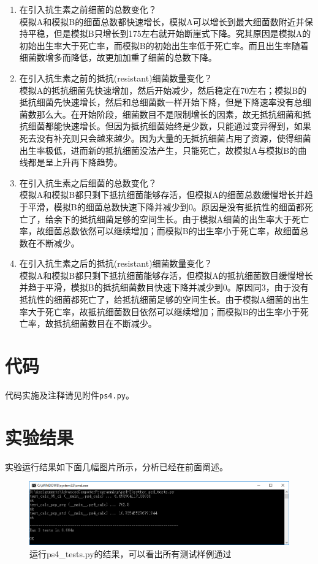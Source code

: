 \documentclass[logo,reportComp]{thesis}
\begin{document}
\begin{enumerate}
	\item 在引入抗生素之前细菌的总数变化？\\
	模拟A和模拟B的细菌总数都快速增长，模拟A可以增长到最大细菌数附近并保持平稳，但是模拟B只增长到175左右就开始断崖式下降。究其原因是模拟A的初始出生率大于死亡率，而模拟B的初始出生率低于死亡率。而且出生率随着细菌数增多而降低，故更加加重了细菌的总数下降。
	\item 在引入抗生素之前的抵抗(resistant)细菌数量变化？\\
	模拟A的抵抗细菌先快速增加，然后开始减少，然后稳定在70左右；模拟B的抵抗细菌先快速增长，然后和总细菌数一样开始下降，但是下降速率没有总细菌数那么大。在开始阶段，细菌数目不是限制增长的因素，故无抵抗细菌和抵抗细菌都能快速增长。但因为抵抗细菌始终是少数，只能通过变异得到，如果死去没有补充则只会越来越少。因为大量的无抵抗细菌占用了资源，使得细菌出生率极低，进而新的抵抗细菌没法产生，只能死亡，故模拟A与模拟B的曲线都是呈上升再下降趋势。
	\item 在引入抗生素之后细菌的总数变化？\\
	模拟A和模拟B都只剩下抵抗细菌能够存活，但模拟A的细菌总数缓慢增长并趋于平滑，模拟B的细菌总数快速下降并减少到0。原因是没有抵抗性的细菌都死亡了，给余下的抵抗细菌足够的空间生长。由于模拟A细菌的出生率大于死亡率，故细菌总数依然可以继续增加；而模拟B的出生率小于死亡率，故细菌总数在不断减少。
	\item 在引入抗生素之后的抵抗(resistant)细菌数量变化？\\
	模拟A和模拟B都只剩下抵抗细菌能够存活，但模拟A的抵抗细菌数目缓慢增长并趋于平滑，模拟B的抵抗细菌数目快速下降并减少到0。原因同3，由于没有抵抗性的细菌都死亡了，给抵抗细菌足够的空间生长。由于模拟A细菌的出生率大于死亡率，故抵抗细菌数目依然可以继续增加；而模拟B的出生率小于死亡率，故抵抗细菌数目在不断减少。
\end{enumerate}

\section{代码}
代码实施及注释请见附件\verb'ps4.py'。

\section{实验结果}
\label{sec:exp}
实验运行结果如下面几幅图片所示，分析已经在前面阐述。

\begin{figure}[H]
\centering
\includegraphics[width=\linewidth]{fig/test.PNG}
\caption{运行ps4\_tests.py的结果，可以看出所有测试样例通过}
\label{fig:test}
\end{figure}
\end{document}
